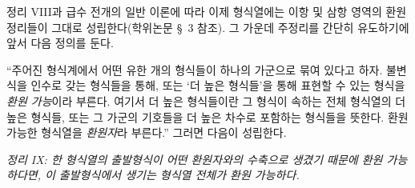 
정리 VIII과 급수 전개의 일반 이론에 따라 이제 형식열에는 이항 및 삼항 영역의 환원 정리들이 그대로 성립한다(학위논문 \S\ 3 참조). 그 가운데 주정리를 간단히 유도하기에 앞서 다음 정의를 둔다.

“주어진 형식계에서 어떤 유한 개의 형식들이 하나의 가군으로 묶여 있다고 하자. 불변식을 인수로 갖는 형식들을 통해, 또는 ‘더 높은 형식들’을 통해 표현할 수 있는 형식을 \emph{환원 가능}이라 부른다. 여기서 더 높은 형식들이란 그 형식이 속하는 전체 형식열의 더 높은 형식들, 또는 그 가군의 기호들을 더 높은 차수로 포함하는 형식들을 뜻한다. 환원 가능한 형식열을 \emph{환원자}라 부른다.” 그러면 다음이 성립한다.

\emph{정리 IX: 한 형식열의 출발형식이 어떤 환원자와의 수축으로 생겼기 때문에 환원 가능하다면, 이 출발형식에서 생기는 형식열 전체가 환원 가능하다.}

